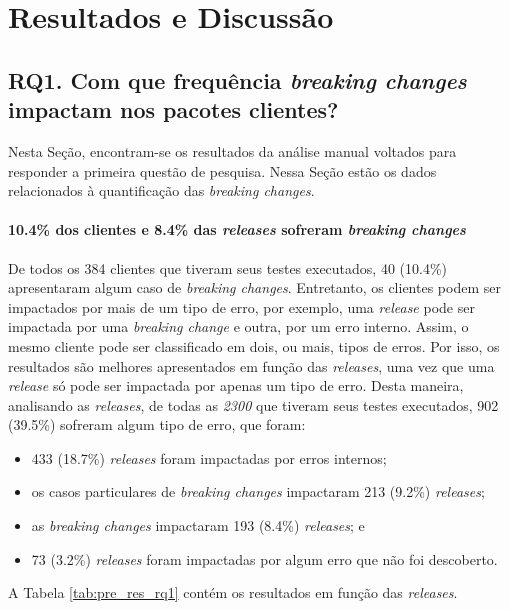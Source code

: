 \chapter{Resultados e Discussão}
\label{cap:results}

\section{RQ1. Com que frequência \textit{breaking changes} impactam nos pacotes clientes?}

Nesta Seção, encontram-se os resultados da análise manual voltados para responder a primeira questão de pesquisa. Nessa Seção estão os dados relacionados à quantificação das \textit{breaking changes}.

\subsubsection{\textbf{10.4\% dos clientes e 8.4\% das \textit{releases} sofreram \textit{breaking changes}}}

De todos os 384 clientes que tiveram seus testes executados, 40 (10.4\%) apresentaram algum caso de \textit{breaking changes}. Entretanto, os clientes podem ser impactados por mais de um tipo de erro, por exemplo, uma \textit{release} pode ser impactada por uma \textit{breaking change} e outra, por um erro interno. Assim, o mesmo cliente pode ser classificado em dois, ou mais, tipos de erros. Por isso, os resultados são melhores apresentados em função das \textit{releases}, uma vez que uma \textit{release} só pode ser impactada por apenas um tipo de erro. Desta maneira, analisando as \textit{releases}, de todas as \textit{2300} que tiveram seus testes executados, 902 (39.5\%) sofreram algum tipo de erro, que foram:

\begin{itemize}
    \item 433 (18.7\%) \textit{releases} foram impactadas por erros internos;
    \item os casos particulares de \textit{breaking changes} impactaram 213 (9.2\%) \textit{releases};
    \item as \textit{breaking changes} impactaram 193 (8.4\%) \textit{releases}; e
    \item 73 (3.2\%) \textit{releases} foram impactadas por algum erro que não foi descoberto.
\end{itemize}{}

A Tabela \ref{tab:pre_res_rq1} contém os resultados em função das \textit{releases}.

